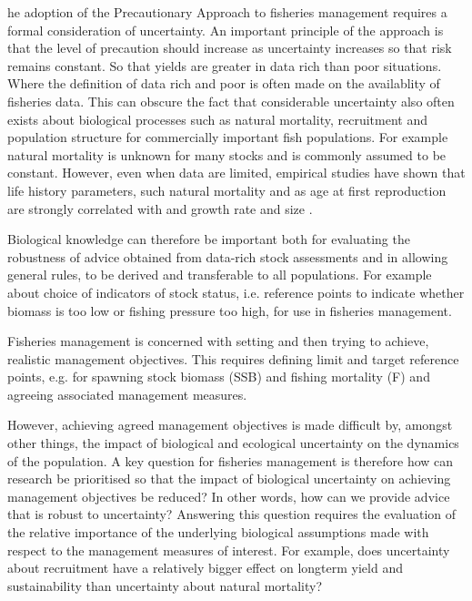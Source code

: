 \documentclass{pnastwo}
\begin{document}
\begin{article}
he adoption of the Precautionary Approach to fisheries management 
\cite{garcia1996precautionary} requires a formal consideration of uncertainty. 
An important principle of the approach is that the level of precaution should 
increase as uncertainty increases so that risk remains constant. So that yields  
are greater in data rich than poor situations. Where the definition of data rich 
and poor is often made on the availablity of fisheries data. 
This can obscure the fact that considerable uncertainty also often exists about 
biological processes such as natural mortality, recruitment and population structure
for commercially important fish populations. For example natural mortality is unknown
for many stocks and is commonly assumed to be constant. However, even when 
data are  limited, empirical studies have shown that life history parameters, such 
natural mortality and as age at first reproduction are strongly correlated with 
and growth rate and size \cite{roff1984evolution}. 

Biological knowledge can therefore be important both for evaluating the robustness 
of advice obtained from data-rich stock assessments and in allowing general rules, 
to be derived and transferable to all populations. For example about choice of 
indicators of stock status, i.e. reference points to indicate whether biomass is too low 
or fishing pressure too high, for use in fisheries management. 

Fisheries management is concerned with setting and then trying to achieve, realistic management 
objectives.  This requires defining limit and target reference points, e.g. for spawning stock 
biomass (SSB) and  fishing mortality (F) and agreeing associated management measures.

However, achieving agreed management objectives is made difficult by, amongst other 
things, the impact of biological and ecological uncertainty on the dynamics of the population.
A key question for fisheries management is therefore how can research be prioritised
so that the impact of biological uncertainty on achieving management objectives
be reduced? In other words, how can we provide advice that is robust to uncertainty?
Answering this question requires the evaluation of the relative importance of the
underlying biological assumptions made  with respect to the
management measures of interest. For example, does uncertainty about recruitment
have a relatively bigger effect on longterm yield and sustainability than uncertainty
about natural mortality? 


\end{article}
\end{document}

